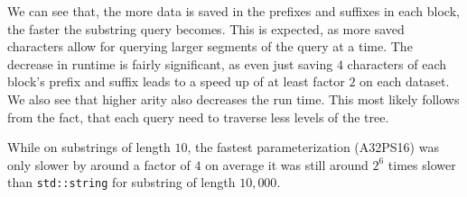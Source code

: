 \documentclass{scrartcl}
\begin{document}
We can see that, the more data is saved in the prefixes and suffixes in each block, the faster the substring query becomes.
This is expected, as more saved characters allow for querying larger segments of the query at a time.
The decrease in runtime is fairly significant, as even just saving $4$ characters of each block's prefix and suffix leads to a speed up of at least factor $2$ on each dataset.
We also see that higher arity also decreases the run time.
This most likely follows from the fact, that each query need to traverse less levels of the tree.

While on substrings of length $10$, the fastest parameterization (A32PS16) was only slower by around a factor of $4$ on average
it was still around $2^6$ times slower than \texttt{std::string} for substring of length $10,000$.
\end{document}
